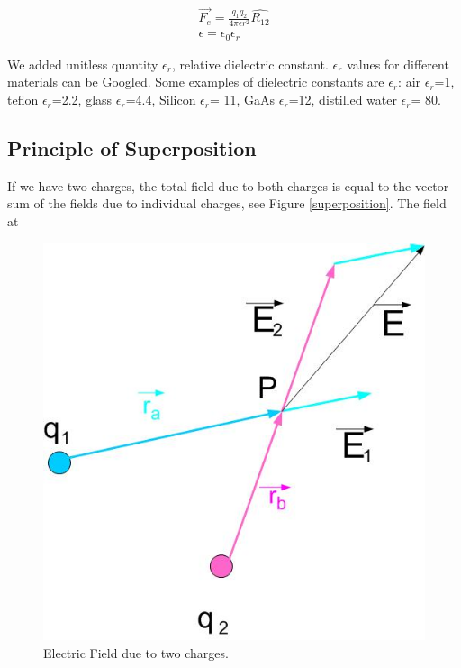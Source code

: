 \documentclass{ximera}
\begin{document}
\begin{eqnarray}
\vec{F_e}=\frac{q_1 q_2}{4 \pi \epsilon r^2} \hat{R_{12}} \\
\epsilon = \epsilon_0 \epsilon_r
\end{eqnarray}\label{Coulombslaw3}

We added unitless quantity $\epsilon_r$, relative dielectric constant. $\epsilon_r$ values for different materials can be Googled. Some examples of dielectric constants are $\epsilon_r$: air $\epsilon_r$=1,  teflon $\epsilon_r$=2.2, glass $\epsilon_r$=4.4, Silicon $\epsilon_r$= 11, GaAs $\epsilon_r$=12, distilled water $\epsilon_r$= 80. 



\subsection{Principle of Superposition}

If we have two charges, the total field due to both charges is equal to the vector sum of the fields due to individual charges, see Figure \ref{superposition}.  The field at



\begin{figure}[htbp]
\begin{center}
\includegraphics[scale=0.5]{../jpg/superposition.jpg}
\end{center}
\caption{Electric Field due to two charges.}
\label{UnitCh}
\end{figure}
\end{document}
